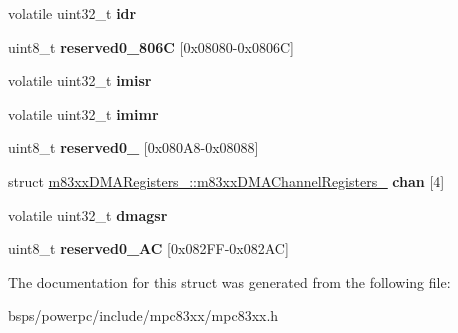 \begin{DoxyCompactItemize}
volatile uint32\+\_\+t {\bfseries idr}
\item 
\mbox{\label{structm83xxDMARegisters___a3ef52a230e7009d0d2d7de36cc71b3eb}} 
uint8\+\_\+t {\bfseries reserved0\+\_\+806C} \mbox{[}0x08080-\/0x0806\+C\mbox{]}
\item 
\mbox{\label{structm83xxDMARegisters___a1bee7cb44d0c5dd97033c1b6ebc212ed}} 
volatile uint32\+\_\+t {\bfseries imisr}
\item 
\mbox{\label{structm83xxDMARegisters___a51bf494795c13c0efaf005264b9fcf6d}} 
volatile uint32\+\_\+t {\bfseries imimr}
\item 
\mbox{\label{structm83xxDMARegisters___a5d78f065be0dfd6e464fb74696c7befc}} 
uint8\+\_\+t {\bfseries reserved0\+\_} \mbox{[}0x080\+A8-\/0x08088\mbox{]}
\item 
\mbox{\label{structm83xxDMARegisters___a6f66ed392fe2b662ad8fb51c54cf4801}} 
struct \mbox{\hyperlink{structm83xxDMARegisters___1_1m83xxDMAChannelRegisters__}{m83xx\+D\+M\+A\+Registers\+\_\+\+::m83xx\+D\+M\+A\+Channel\+Registers\+\_\+}} {\bfseries chan} \mbox{[}4\mbox{]}
\item 
\mbox{\label{structm83xxDMARegisters___afb9c7face5b3d4b42ca4fa6fc14e37d9}} 
volatile uint32\+\_\+t {\bfseries dmagsr}
\item 
\mbox{\label{structm83xxDMARegisters___a621a914143d1235d3ffdad8c981e2137}} 
uint8\+\_\+t {\bfseries reserved0\+\_\+AC} \mbox{[}0x082\+F\+F-\/0x082\+A\+C\mbox{]}
\end{DoxyCompactItemize}


The documentation for this struct was generated from the following file\+:\begin{DoxyCompactItemize}
\item 
bsps/powerpc/include/mpc83xx/mpc83xx.\+h\end{DoxyCompactItemize}
